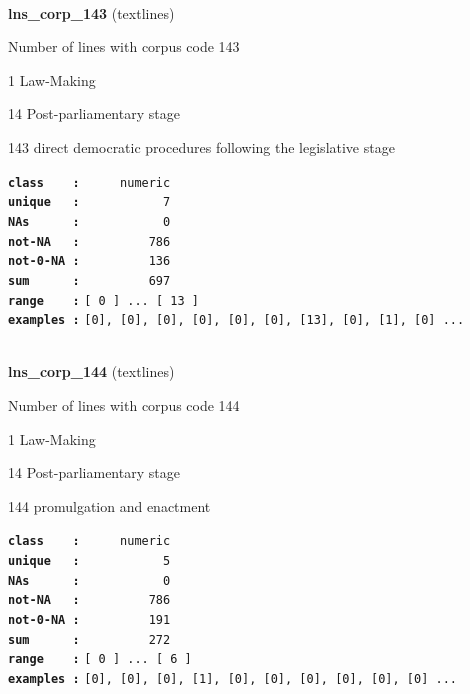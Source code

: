 \documentclass[]{article}
\begin{document}
~

\textbf{lns\_corp\_143} (textlines)

Number of lines with corpus code 143

1 Law-Making

14 Post-parliamentary stage

143 direct democratic procedures following the legislative stage

\textbf{\texttt{class\ \ \ \ :}} \texttt{~~~~~numeric}\\
\textbf{\texttt{unique\ \ \ :}} \texttt{~~~~~~~~~~~7}\\
\textbf{\texttt{NAs\ \ \ \ \ \ :}} \texttt{~~~~~~~~~~~0}\\
\textbf{\texttt{not-NA\ \ \ :}} \texttt{~~~~~~~~~786}\\
\textbf{\texttt{not-0-NA\ :}} \texttt{~~~~~~~~~136}\\
\textbf{\texttt{sum\ \ \ \ \ \ :}} \texttt{~~~~~~~~~697}\\
\textbf{\texttt{range\ \ \ \ :}}
\texttt{{[}\ 0\ {]}\ ...\ {[}\ 13\ {]}}\\
\textbf{\texttt{examples\ :}}
\texttt{{[}0{]},\ {[}0{]},\ {[}0{]},\ {[}0{]},\ {[}0{]},\ {[}0{]},\ {[}13{]},\ {[}0{]},\ {[}1{]},\ {[}0{]}\ ...}\\

~

\textbf{lns\_corp\_144} (textlines)

Number of lines with corpus code 144

1 Law-Making

14 Post-parliamentary stage

144 promulgation and enactment

\textbf{\texttt{class\ \ \ \ :}} \texttt{~~~~~numeric}\\
\textbf{\texttt{unique\ \ \ :}} \texttt{~~~~~~~~~~~5}\\
\textbf{\texttt{NAs\ \ \ \ \ \ :}} \texttt{~~~~~~~~~~~0}\\
\textbf{\texttt{not-NA\ \ \ :}} \texttt{~~~~~~~~~786}\\
\textbf{\texttt{not-0-NA\ :}} \texttt{~~~~~~~~~191}\\
\textbf{\texttt{sum\ \ \ \ \ \ :}} \texttt{~~~~~~~~~272}\\
\textbf{\texttt{range\ \ \ \ :}}
\texttt{{[}\ 0\ {]}\ ...\ {[}\ 6\ {]}}\\
\textbf{\texttt{examples\ :}}
\texttt{{[}0{]},\ {[}0{]},\ {[}0{]},\ {[}1{]},\ {[}0{]},\ {[}0{]},\ {[}0{]},\ {[}0{]},\ {[}0{]},\ {[}0{]}\ ...}\\
\end{document}
